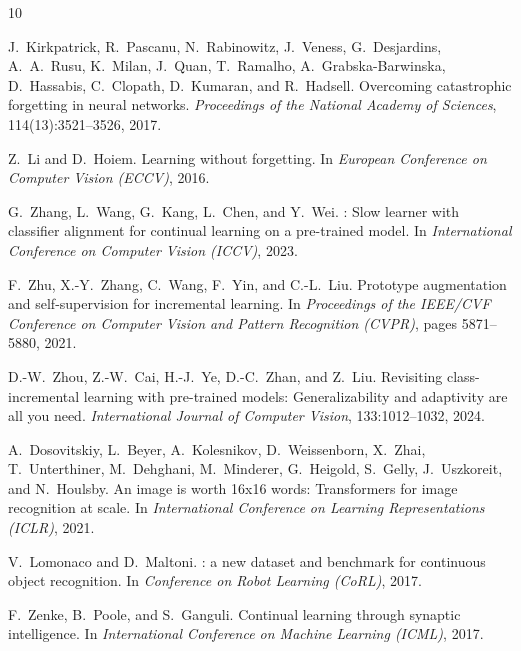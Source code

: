 \documentclass{article}
\begin{document}
\begingroup
\renewcommand{\section}[2]{}
\begin{thebibliography}{10}

J.~Kirkpatrick, R.~Pascanu, N.~Rabinowitz, J.~Veness, G.~Desjardins,
A.~A.~Rusu, K.~Milan, J.~Quan, T.~Ramalho, A.~Grabska-Barwinska,
D.~Hassabis, C.~Clopath, D.~Kumaran, and R.~Hadsell.
\newblock Overcoming catastrophic forgetting in neural networks.
\newblock \emph{Proceedings of the National Academy of Sciences},
  114(13):3521--3526, 2017.

Z.~Li and D.~Hoiem.
\newblock Learning without forgetting.
\newblock In \emph{European Conference on Computer Vision (ECCV)}, 2016.

G.~Zhang, L.~Wang, G.~Kang, L.~Chen, and Y.~Wei.
: Slow learner with classifier alignment for continual learning
  on a pre-trained model.
\newblock In \emph{International Conference on Computer Vision (ICCV)}, 2023.

F.~Zhu, X.-Y.~Zhang, C.~Wang, F.~Yin, and C.-L.~Liu.
\newblock Prototype augmentation and self-supervision for incremental learning.
\newblock In \emph{Proceedings of the IEEE/CVF Conference on Computer Vision
  and Pattern Recognition (CVPR)}, pages 5871--5880, 2021.

D.-W.~Zhou, Z.-W.~Cai, H.-J.~Ye, D.-C.~Zhan, and Z.~Liu.
\newblock Revisiting class-incremental learning with pre-trained models:
  Generalizability and adaptivity are all you need.
\newblock \emph{International Journal of Computer Vision}, 133:1012--1032,
  2024.

A.~Dosovitskiy, L.~Beyer, A.~Kolesnikov, D.~Weissenborn, X.~Zhai,
T.~Unterthiner, M.~Dehghani, M.~Minderer, G.~Heigold, S.~Gelly,
J.~Uszkoreit, and N.~Houlsby.
\newblock An image is worth 16x16 words: Transformers for image recognition
  at scale.
\newblock In \emph{International Conference on Learning Representations
  (ICLR)}, 2021.

V.~Lomonaco and D.~Maltoni.
: a new dataset and benchmark for continuous object
  recognition.
\newblock In \emph{Conference on Robot Learning (CoRL)}, 2017.

F.~Zenke, B.~Poole, and S.~Ganguli.
\newblock Continual learning through synaptic intelligence.
\newblock In \emph{International Conference on Machine Learning (ICML)}, 2017.

\end{thebibliography}
\endgroup
\end{document}
